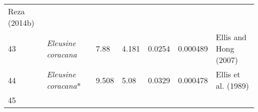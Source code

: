 \documentclass[]{article}
\begin{document}
\begin{longtable}[]{@{}lllllll@{}}
\begin{minipage}[t]{0.23\columnwidth}
Reza (2014b)\strut
\end{minipage}\tabularnewline
\begin{minipage}[t]{0.05\columnwidth}\raggedright
43\strut
\end{minipage} & \begin{minipage}[t]{0.23\columnwidth}\raggedright
\emph{Eleusine coracana}\strut
\end{minipage} & \begin{minipage}[t]{0.05\columnwidth}\raggedright
7.88\strut
\end{minipage} & \begin{minipage}[t]{0.08\columnwidth}\raggedright
4.181\strut
\end{minipage} & \begin{minipage}[t]{0.08\columnwidth}\raggedright
0.0254\strut
\end{minipage} & \begin{minipage}[t]{0.08\columnwidth}\raggedright
0.000489\strut
\end{minipage} & \begin{minipage}[t]{0.23\columnwidth}\raggedright
Ellis and Hong (2007)\strut
\end{minipage}\tabularnewline
\begin{minipage}[t]{0.05\columnwidth}\raggedright
44\strut
\end{minipage} & \begin{minipage}[t]{0.23\columnwidth}\raggedright
\emph{Eleusine coracana}*\strut
\end{minipage} & \begin{minipage}[t]{0.05\columnwidth}\raggedright
9.508\strut
\end{minipage} & \begin{minipage}[t]{0.08\columnwidth}\raggedright
5.08\strut
\end{minipage} & \begin{minipage}[t]{0.08\columnwidth}\raggedright
0.0329\strut
\end{minipage} & \begin{minipage}[t]{0.08\columnwidth}\raggedright
0.000478\strut
\end{minipage} & \begin{minipage}[t]{0.23\columnwidth}\raggedright
Ellis et al. (1989)\strut
\end{minipage}\tabularnewline
\begin{minipage}[t]{0.05\columnwidth}\raggedright
45\strut
\end{minipage} & \begin{minipage}[t]{0.23\columnwidth}\raggedright

\end{minipage}
\end{longtable}
\end{document}
